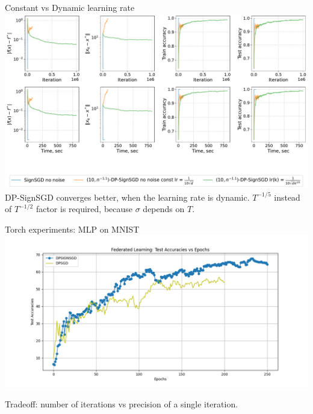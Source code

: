 \documentclass{beamer}
\begin{document}
\begin{frame}{Constant vs Dynamic learning rate}
    \includegraphics[width=1.0\textwidth]{v28_dynamic_step/long/v28_dynamic_step_long.pdf} 
DP-SignSGD converges better, when the learning rate is dynamic. $T^{-1/5}$ instead of $T^{-1/2}$ factor is required, because $\sigma$ depends on $T$.
\end{frame}

\begin{frame}{Torch experiments: MLP on MNIST}
\includegraphics[width=1.0\textwidth]{dpsign_vs_dp_untuned.png}

Tradeoff: number of iterations vs precision of a single iteration.
\end{frame}
\end{document}
